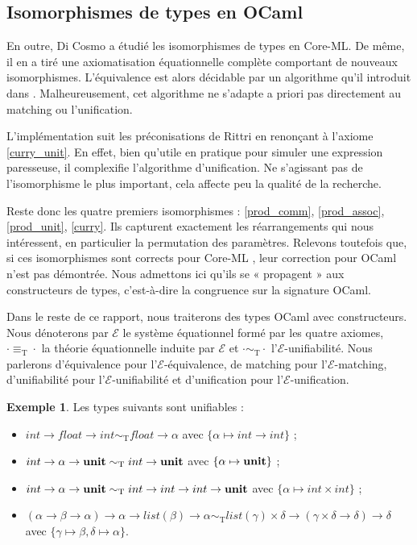 \documentclass[a4paper]{report}
\theoremstyle{definition}
\newtheorem{exemple}[theoreme]{Exemple}
\newcommand{\unit}{\bold{unit}}
\newcommand{\E}{\mathscr{E}}
\newcommand{\T}{\mathrm{T}}
\begin{document}
\subsection{Isomorphismes de types en OCaml}

En outre, Di Cosmo \cite{DiCosmo92} a étudié les isomorphismes de types en Core-ML. De même, il en a tiré une axiomatisation équationnelle complète comportant de nouveaux isomorphismes. L'équivalence est alors décidable par un algorithme qu'il introduit dans \cite{DiCosmo95}. Malheureusement, cet algorithme ne s'adapte a priori pas directement au matching ou l'unification.

L'implémentation suit les préconisations de Rittri en renonçant à l'axiome \eqref{curry_unit}. En effet, bien qu'utile en pratique pour simuler une expression paresseuse, il complexifie l'algorithme d'unification. Ne s'agissant pas de l'isomorphisme le plus important, cela affecte peu la qualité de la recherche.

Reste donc les quatre premiers isomorphismes : \eqref{prod_comm}, \eqref{prod_assoc}, \eqref{prod_unit}, \eqref{curry}. Ils capturent exactement les réarrangements qui nous intéressent, en particulier la permutation des paramètres. Relevons toutefois que, si ces isomorphismes sont corrects pour Core-ML \cite{DiCosmo93}, leur correction pour OCaml n'est pas démontrée. Nous admettons ici qu'ils se « propagent » aux constructeurs de types, c'est-à-dire la congruence sur la signature OCaml.

Dans le reste de ce rapport, nous traiterons des types OCaml avec constructeurs. Nous dénoterons par $\E$ le système équationnel formé par les quatre axiomes, $\cdot \equiv_\T \cdot$ la théorie équationnelle induite par $\E$ et $\cdot \sim_\T \cdot$ l'$\E$-unifiabilité. Nous parlerons d'équivalence pour l'$\E$-équivalence, de matching pour l'$\E$-matching, d'unifiabilité pour l'$\E$-unifiabilité et d'unification pour l'$\E$-unification.

\begin{exemple}
  Les types suivants sont unifiables :
  \begin{itemize}
    \item $int \rightarrow float \rightarrow int \sim_\T float \rightarrow \alpha$ avec $\{ \alpha \mapsto int \rightarrow int \}$ ;
    \item $int \rightarrow \alpha \rightarrow \unit \sim_\T int \rightarrow \unit$ avec $\{ \alpha \mapsto \unit \}$ ;
    \item $int \rightarrow \alpha \rightarrow \unit \sim_\T int \rightarrow int \rightarrow int \rightarrow \unit$ avec $\{ \alpha \mapsto int \times int \}$ ;
    \item $(\alpha \rightarrow \beta \rightarrow \alpha) \rightarrow \alpha \rightarrow list (\beta) \rightarrow \alpha \sim_\T list (\gamma) \times \delta \rightarrow (\gamma \times \delta \rightarrow \delta) \rightarrow \delta$ \\ avec $\{ \gamma \mapsto \beta, \delta \mapsto \alpha \}$.
  \end{itemize}
\end{exemple}
\end{document}
